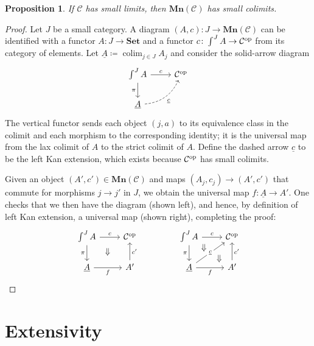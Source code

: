 \documentclass[11pt, one side, article]{memoir}
\theoremstyle{definition}
\theoremstyle{plain}
\newtheorem{proposition}[definitionx]{Proposition}
\DeclareMathOperator*{\colim}{colim}
\newcommand{\cat}[1]{\mathcal{#1}}%
\newcommand{\Cat}[1]{\mathbf{#1}}%
\newcommand{\op}{^\tn{op}}
\newcommand{\tn}[1]{\textnormal{#1}}
\newcommand{\ul}[1]{\underline{#1}}
\newcommand{\smset}{\Cat{Set}}
\newcommand{\0}{\Cat{0}}
\newcommand{\1}{\Cat{1}}
\newcommand{\mn}{\Cat{Mn}}
\begin{document}
\begin{proposition}\label{prop.limits_to_colimits}
If $\cat{C}$ has small limits, then $\mn(\cat{C})$ has small colimits.
\end{proposition}
\begin{proof}
Let $J$ be a small category. A diagram $(A,c)\colon J\to \mn(\cat{C})$ can be identified with a functor $A\colon J\to \smset$ and a functor $c\colon \int^JA\to\cat{C}\op$ from its category of elements. Let $\ul{A}\coloneqq\colim_{j\in J}A_j$ and consider the solid-arrow diagram
\[
\begin{tikzcd}
	\int^JA\ar[r, "c"]\ar[d, "\pi"']&
	\cat{C}\op\\
	\ul{A}\ar[ur, bend right, dashed, "\ul{c}"']
\end{tikzcd}
\]
The vertical functor sends each object $(j,a)$ to its equivalence class in the colimit and each morphism to the corresponding identity; it is the universal map from the lax colimit of $A$ to the strict colimit of $A$. Define the dashed arrow $\ul{c}$ to be the left Kan extension, which exists because $\cat{C}\op$ has small colimits.

Given an object $(A',c')\in\mn(\cat{C})$ and maps $(A_j,c_j)\to(A',c')$ that commute for morphisms $j\to j'$ in $J$, we obtain the universal map $f\colon\ul{A}\to A'$. One checks that we then have the diagram (shown left), and hence, by definition of left Kan extension, a universal map (shown right), completing the proof:
\[
\begin{tikzcd}
	\int^JA\ar[r, "c"]\ar[d, "\pi"']&
	\cat{C}\op\\
	\ul{A}\ar[r, "f"']&A'\ar[u, "c'"']\ar[ul, phantom, pos=.6, "\Downarrow"]
\end{tikzcd}
\hspace{.6in}
\begin{tikzcd}
	\int^JA\ar[r, "c"]\ar[d, "\pi"']&
	\cat{C}\op\\
	\ul{A}\ar[r, "f"']\ar[ur, "\ul{c}" description]&A'\ar[u, "c'"']
	\ar[ul, phantom, pos=.2, "\Downarrow"]\ar[ul, phantom, pos=.85, "\Downarrow"]
\end{tikzcd}
\qedhere
\]
\end{proof}

\section{Extensivity}
\end{document}
